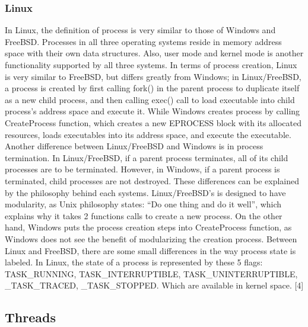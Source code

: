 \documentclass[10pt,a4paper]{article}
\begin{document}
\subsubsection{Linux}
In Linux, the definition of process is very similar to those of Windows and FreeBSD. Processes in all three operating systems reside in memory address space with their own data structures. Also, user mode and kernel mode is another functionality supported by all three systems. In terms of process creation, Linux is very similar to FreeBSD, but differs greatly from Windows; in Linux/FreeBSD, a process is created by first calling fork() in the parent process to duplicate itself as a new child process, and then calling exec() call to load executable into child process’s address space and execute it. While Windows creates process by calling CreateProcess function, which creates a new EPROCESS block with its allocated resources, loads executables into its address space, and execute the executable. Another difference between Linux/FreeBSD and Windows is in process termination. In Linux/FreeBSD, if a parent process terminates, all of its child processes are to be terminated. However, in Windows, if a parent process is terminated, child processes are not destroyed. These differences can be explained by the philosophy behind each systems. Linux/FreeBSD’s is designed to have modularity, as Unix philosophy states: “Do one thing and do it well”, which explains why it takes 2 functions calls to create a new process. On the other hand, Windows puts the process creation steps into CreateProcess function, as Windows does not see the benefit of modularizing the creation process. Between Linux and FreeBSD, there are some small differences in the way process state is labeled. In Linux, the state of a process is represented by these 5 flags: TASK\_RUNNING, TASK\_INTERRUPTIBLE, TASK\_UNINTERRUPTIBLE, \_TASK\_TRACED, \_TASK\_STOPPED. Which are available in kernel space. [4]

\subsection{Threads}
\end{document}
